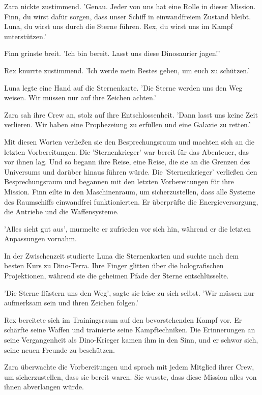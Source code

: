\documentclass[12pt]{article}
\begin{document}
Zara nickte zustimmend. 'Genau. Jeder von uns hat eine Rolle in dieser Mission. Finn, du wirst dafür sorgen, dass unser Schiff in einwandfreiem Zustand bleibt. Luna, du wirst uns durch die Sterne führen. Rex, du wirst uns im Kampf unterstützen.'

Finn grinste breit. 'Ich bin bereit. Lasst uns diese Dinosaurier jagen!'

Rex knurrte zustimmend. 'Ich werde mein Bestes geben, um euch zu schützen.'

Luna legte eine Hand auf die Sternenkarte. 'Die Sterne werden uns den Weg weisen. Wir müssen nur auf ihre Zeichen achten.'

Zara sah ihre Crew an, stolz auf ihre Entschlossenheit. 'Dann lasst uns keine Zeit verlieren. Wir haben eine Prophezeiung zu erfüllen und eine Galaxie zu retten.'

Mit diesen Worten verließen sie den Besprechungsraum und machten sich an die letzten Vorbereitungen. Die 'Sternenkrieger' war bereit für das Abenteuer, das vor ihnen lag. Und so begann ihre Reise, eine Reise, die sie an die Grenzen des Universums und darüber hinaus führen würde. Die 'Sternenkrieger' verließen den Besprechungsraum und begannen mit den letzten Vorbereitungen für ihre Mission. Finn eilte in den Maschinenraum, um sicherzustellen, dass alle Systeme des Raumschiffs einwandfrei funktionierten. Er überprüfte die Energieversorgung, die Antriebe und die Waffensysteme.

'Alles sieht gut aus', murmelte er zufrieden vor sich hin, während er die letzten Anpassungen vornahm.

In der Zwischenzeit studierte Luna die Sternenkarten und suchte nach dem besten Kurs zu Dino-Terra. Ihre Finger glitten über die holografischen Projektionen, während sie die geheimen Pfade der Sterne entschlüsselte.

'Die Sterne flüstern uns den Weg', sagte sie leise zu sich selbst. 'Wir müssen nur aufmerksam sein und ihren Zeichen folgen.'

Rex bereitete sich im Trainingsraum auf den bevorstehenden Kampf vor. Er schärfte seine Waffen und trainierte seine Kampftechniken. Die Erinnerungen an seine Vergangenheit als Dino-Krieger kamen ihm in den Sinn, und er schwor sich, seine neuen Freunde zu beschützen.

Zara überwachte die Vorbereitungen und sprach mit jedem Mitglied ihrer Crew, um sicherzustellen, dass sie bereit waren. Sie wusste, dass diese Mission alles von ihnen abverlangen würde.
\end{document}
